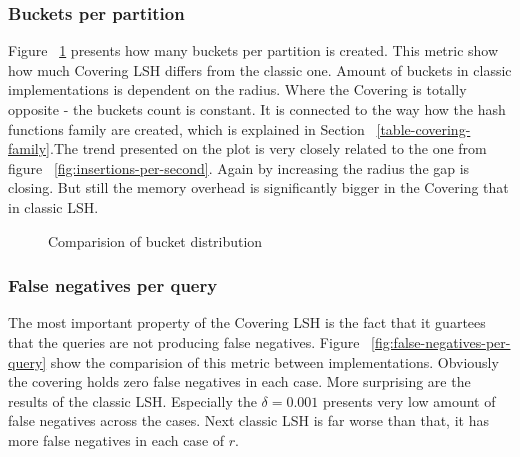 \subsubsection{Buckets per partition}

Figure ~\ref{fig:buckets-per-partition} presents how many buckets per partition
is created. This metric show how much Covering LSH differs from the classic one.
Amount of buckets in classic implementations is dependent on the radius. Where
the Covering is totally opposite - the buckets count is constant. It is
connected to the way how the hash functions family are created, which is
explained in Section ~\ref{table-covering-family}.The trend presented on the
plot is very closely related  to the one from figure ~\ref{fig:insertions-per-second}. Again by increasing the radius the gap is closing. But still the memory overhead is significantly bigger in the Covering that in classic LSH.

\begin{figure}[ht]

  \caption{Comparision of bucket distribution}
  \label{fig:buckets-per-partition}
\end{figure}

\subsubsection{False negatives per query}

The most important property of the Covering LSH is the fact that it guartees that the queries are not producing false negatives. Figure ~\ref{fig:false-negatives-per-query} show the comparision of this metric between implementations. Obviously the covering holds zero false negatives in each case. More surprising are the results of the classic LSH. Especially the $\delta = 0.001$ presents very low amount of false negatives across the cases. Next classic LSH is far worse than that, it has more false negatives in each case of $r$.

